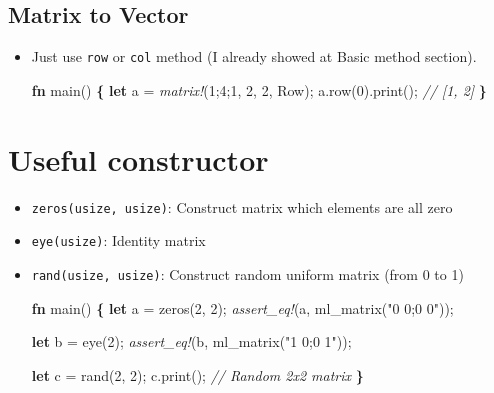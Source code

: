 \documentclass[]{book}
\newenvironment{Shaded}{\begin{snugshade}}{\end{snugshade}}
\newcommand{\CommentTok}[1]{\textcolor[rgb]{0.56,0.35,0.01}{\textit{#1}}}
\newcommand{\DecValTok}[1]{\textcolor[rgb]{0.00,0.00,0.81}{#1}}
\newcommand{\KeywordTok}[1]{\textcolor[rgb]{0.13,0.29,0.53}{\textbf{#1}}}
\newcommand{\NormalTok}[1]{#1}
\newcommand{\OperatorTok}[1]{\textcolor[rgb]{0.81,0.36,0.00}{\textbf{#1}}}
\newcommand{\PreprocessorTok}[1]{\textcolor[rgb]{0.56,0.35,0.01}{\textit{#1}}}
\newcommand{\StringTok}[1]{\textcolor[rgb]{0.31,0.60,0.02}{#1}}
\begin{document}
\hypertarget{matrix-to-vector}{%
\subsection{Matrix to Vector}\label{matrix-to-vector}}

\begin{itemize}
\item
  Just use \texttt{row} or \texttt{col} method (I already showed at Basic method section).

\begin{Shaded}
\begin{Highlighting}[]
\KeywordTok{fn}\NormalTok{ main() }\OperatorTok{\{}
    \KeywordTok{let}\NormalTok{ a = }\PreprocessorTok{matrix!}\NormalTok{(}\DecValTok{1}\NormalTok{;}\DecValTok{4}\NormalTok{;}\DecValTok{1}\NormalTok{, }\DecValTok{2}\NormalTok{, }\DecValTok{2}\NormalTok{, Row);}
\NormalTok{    a.row(}\DecValTok{0}\NormalTok{).print(); }\CommentTok{// [1, 2]}
\OperatorTok{\}}
\end{Highlighting}
\end{Shaded}
\end{itemize}

\hypertarget{useful-constructor}{%
\section{Useful constructor}\label{useful-constructor}}

\begin{itemize}
\item
  \texttt{zeros(usize,\ usize)}: Construct matrix which elements are all zero
\item
  \texttt{eye(usize)}: Identity matrix
\item
  \texttt{rand(usize,\ usize)}: Construct random uniform matrix (from 0 to 1)

\begin{Shaded}
\begin{Highlighting}[]
\KeywordTok{fn}\NormalTok{ main() }\OperatorTok{\{}
    \KeywordTok{let}\NormalTok{ a = zeros(}\DecValTok{2}\NormalTok{, }\DecValTok{2}\NormalTok{);}
    \PreprocessorTok{assert_eq!}\NormalTok{(a, ml_matrix(}\StringTok{"0 0;0 0"}\NormalTok{));}

    \KeywordTok{let}\NormalTok{ b = eye(}\DecValTok{2}\NormalTok{);}
    \PreprocessorTok{assert_eq!}\NormalTok{(b, ml_matrix(}\StringTok{"1 0;0 1"}\NormalTok{));}

    \KeywordTok{let}\NormalTok{ c = rand(}\DecValTok{2}\NormalTok{, }\DecValTok{2}\NormalTok{);}
\NormalTok{    c.print(); }\CommentTok{// Random 2x2 matrix}
\OperatorTok{\}}
\end{Highlighting}
\end{Shaded}
\end{itemize}
\end{document}
